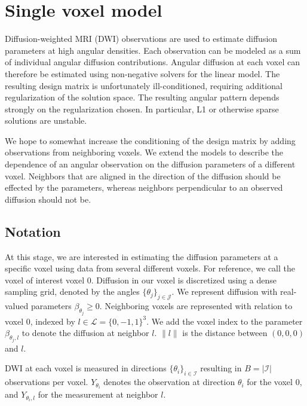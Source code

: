 \documentclass[11pt]{amsart}
\newcommand{\tj}{\theta_j}
\newcommand{\ti}{\theta_i}
\newcommand{\yti}{Y_{\theta_i}}
\newcommand{\ytil}{Y_{\theta_i,l}}
\begin{document}
\section{Single voxel model}
Diffusion-weighted MRI (DWI) observations are used to estimate diffusion parameters at high angular densities. 
Each observation can be modeled as a sum of individual angular diffusion contributions. 
Angular diffusion at each voxel can therefore be estimated using non-negative solvers for the linear model. 
The resulting design matrix is unfortunately ill-conditioned, requiring additional regularization of the solution space. 
The resulting angular pattern depends strongly on the regularization chosen. 
In particular, L1 or otherwise sparse solutions are unstable. 

We hope to somewhat increase the conditioning of the design matrix by adding observations 
from neighboring voxels. We extend the models to describe the dependence of 
an angular observation on the diffusion parameters of a different voxel. Neighbors 
that are aligned in the direction of the diffusion should be effected by the parameters,  
whereas neighbors perpendicular to an observed diffusion should not be. 

\subsection{Notation}

At this stage, we are interested in estimating the diffusion parameters at a 
specific voxel using data from several different voxels. 
For reference, we call the voxel of interest voxel 0. 
Diffusion in our voxel is discretized using a dense sampling grid, denoted by
the angles $\{\tj\}_{j \in \mathcal{J}}$. 
We represent diffusion with real-valued parameters $\beta_{\tj}\geq 0$.
Neighboring voxels are represented with relation to voxel $0$, indexed by $l \in \mathcal{L} = \{0,-1,1\}^3$. 
We add the voxel index to the parameter $\beta_{\tj, l}$ to denote the diffusion at neighbor $l$. 
$\|l\|$ is the distance between $(0,0,0)$ and $l$.

DWI at each voxel is measured in directions $\{\ti\}_{ i \in \mathcal{I}}$ resulting in  $B = |\mathcal{I}| $ observations per voxel.  
$\yti$ denotes the observation at direction $\ti$ for the voxel 0, and $\ytil$ for the 
measurement at neighbor $l$. 
\end{document}
